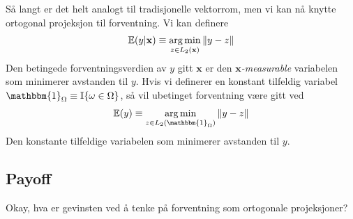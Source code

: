 Så langt er det helt analogt til tradisjonelle vektorrom, men vi kan nå knytte ortogonal projeksjon til forventning. Vi kan definere
\begin{align}
\mathbb{E}(y|\mathbf{x}) \equiv \operatorname*{arg\,min}_{z \in L_2(\mathbf{x})} \|y-z\|
\end{align}
Den betingede forventningsverdien av $y$ gitt  $\mathbf{x}$ er den $\mathbf{x}$\textit{-measurable} variabelen som minimerer avstanden til $y$. Hvis vi definerer en konstant tilfeldig variabel $\mathbbm{1}_\Omega \equiv \mathbb{I}\{\omega \in \Omega\}$, så vil ubetinget forventning være gitt ved
\begin{align}
\mathbb{E}(y) \equiv \argmin_{z \in L_2(\mathbbm{1}_\Omega)} \| y-z \|
\end{align}
Den konstante tilfeldige variabelen som minimerer avstanden til $y$.
\subsection{Payoff}
Okay, hva er gevinsten ved å tenke på forventning som ortogonale projeksjoner?
